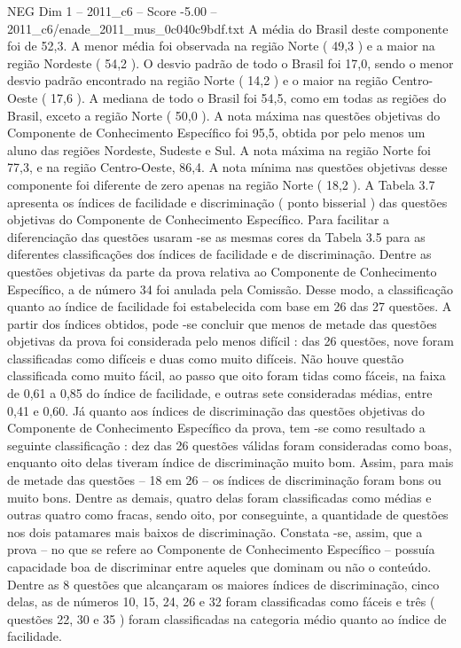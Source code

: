\begin{textsample}{NEG Dim 1 – 2011\_c6 – Score -5.00 – 2011\_c6/enade\_2011\_mus\_0c040c9bdf.txt}
A média do Brasil deste componente foi de 52,3.
A menor média foi observada na região Norte ( 49,3 ) e a maior na região Nordeste ( 54,2 ).
O desvio padrão de todo o Brasil foi 17,0, sendo o menor desvio padrão encontrado na região Norte ( 14,2 ) e o maior na região Centro-Oeste ( 17,6 ).
A mediana de todo o Brasil foi 54,5, como em todas as regiões do Brasil, exceto a região Norte ( 50,0 ).
A nota máxima nas questões objetivas do Componente de Conhecimento Específico foi 95,5, obtida por pelo menos um aluno das regiões Nordeste, Sudeste e Sul.
A nota máxima na região Norte foi 77,3, e na região Centro-Oeste, 86,4.
A nota mínima nas questões objetivas desse componente foi diferente de zero apenas na região Norte ( 18,2 ).
A Tabela 3.7 apresenta os índices de facilidade e discriminação ( ponto bisserial ) das questões objetivas do Componente de Conhecimento Específico.
Para facilitar a diferenciação das questões usaram -se as mesmas cores da Tabela 3.5 para as diferentes classificações dos índices de facilidade e de discriminação.
Dentre as questões objetivas da parte da prova relativa ao Componente de Conhecimento Específico, a de número 34 foi anulada pela Comissão.
Desse modo, a classificação quanto ao índice de facilidade foi estabelecida com base em 26 das 27 questões.
A partir dos índices obtidos, pode -se concluir que menos de metade das questões objetivas da prova foi considerada pelo menos difícil : das 26 questões, nove foram classificadas como difíceis e duas como muito difíceis.
Não houve questão classificada como muito fácil, ao passo que oito foram tidas como fáceis, na faixa de 0,61 a 0,85 do índice de facilidade, e outras sete consideradas médias, entre 0,41 e 0,60.
Já quanto aos índices de discriminação das questões objetivas do Componente de Conhecimento Específico da prova, tem -se como resultado a seguinte classificação : dez das 26 questões válidas foram consideradas como boas, enquanto oito delas tiveram índice de discriminação muito bom.
Assim, para mais de metade das questões – 18 em 26 – os índices de discriminação foram bons ou muito bons.
Dentre as demais, quatro delas foram classificadas como médias e outras quatro como fracas, sendo oito, por conseguinte, a quantidade de questões nos dois patamares mais baixos de discriminação.
Constata -se, assim, que a prova – no que se refere ao Componente de Conhecimento Específico – possuía capacidade boa de discriminar entre aqueles que dominam ou não o conteúdo.
Dentre as 8 questões que alcançaram os maiores índices de discriminação, cinco delas, as de números 10, 15, 24, 26 e 32 foram classificadas como fáceis e três ( questões 22, 30 e 35 ) foram classificadas na categoria médio quanto ao índice de facilidade.

\end{textsample}
